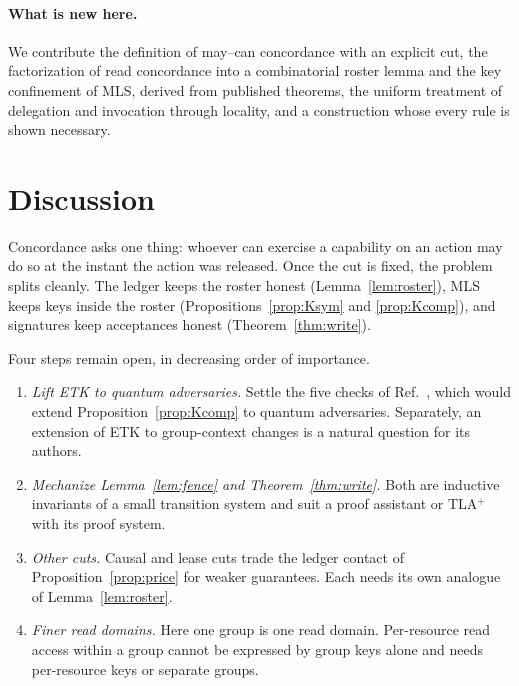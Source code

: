 \documentclass[aps,prx,reprint,superscriptaddress,nofootinbib,floatfix]{revtex4-2}
\theoremstyle{remark}
\begin{document}
\paragraph*{What is new here.} We contribute the definition of may--can concordance with an explicit cut, the factorization of read concordance into a combinatorial roster lemma and the key confinement of MLS, derived from published theorems, the uniform treatment of delegation and invocation through locality, and a construction whose every rule is shown necessary.

\section{Discussion}\label{sec:discussion}

Concordance asks one thing: whoever can exercise a capability on an action may do so at the instant the action was released. Once the cut is fixed, the problem splits cleanly. The ledger keeps the roster honest (Lemma~\ref{lem:roster}), MLS keeps keys inside the roster (Propositions~\ref{prop:Ksym} and \ref{prop:Kcomp}), and signatures keep acceptances honest (Theorem~\ref{thm:write}).

Four steps remain open, in decreasing order of importance.
\begin{enumerate}
\item \emph{Lift ETK to quantum adversaries.} Settle the five checks of Ref.~\cite{note-qrom}, which would extend Proposition~\ref{prop:Kcomp} to quantum adversaries. Separately, an extension of ETK to group-context changes is a natural question for its authors.
\item \emph{Mechanize Lemma~\ref{lem:fence} and Theorem~\ref{thm:write}.} Both are inductive invariants of a small transition system and suit a proof assistant or TLA$^+$ with its proof system.
\item \emph{Other cuts.} Causal and lease cuts trade the ledger contact of Proposition~\ref{prop:price} for weaker guarantees. Each needs its own analogue of Lemma~\ref{lem:roster}.
\item \emph{Finer read domains.} Here one group is one read domain. Per-resource read access within a group cannot be expressed by group keys alone and needs per-resource keys or separate groups.
\end{enumerate}

\appendix
\end{document}

